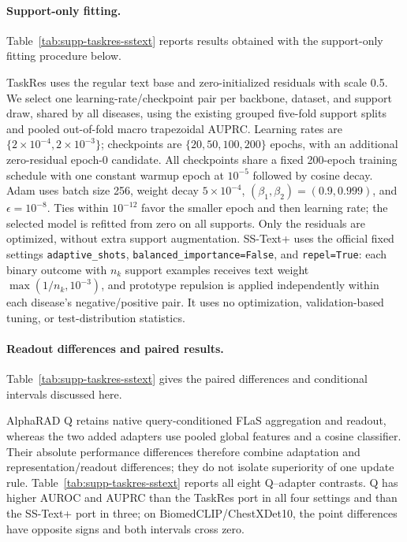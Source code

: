 \paragraph{Support-only fitting.}
Table~\ref{tab:supp-taskres-sstext} reports results obtained with the support-only fitting procedure below.

TaskRes uses the regular text base and zero-initialized residuals with scale 0.5. We select one learning-rate/checkpoint pair per backbone, dataset, and support draw, shared by all diseases, using the existing grouped five-fold support splits and pooled out-of-fold macro trapezoidal AUPRC. Learning rates are $\{2\!\times\!10^{-4},2\!\times\!10^{-3}\}$; checkpoints are $\{20,50,100,200\}$ epochs, with an additional zero-residual epoch-0 candidate. All checkpoints share a fixed 200-epoch training schedule with one constant warmup epoch at $10^{-5}$ followed by cosine decay. Adam uses batch size 256, weight decay $5\!\times\!10^{-4}$, $(\beta_1,\beta_2)=(0.9,0.999)$, and $\epsilon=10^{-8}$. Ties within $10^{-12}$ favor the smaller epoch and then learning rate; the selected model is refitted from zero on all supports. Only the residuals are optimized, without extra support augmentation. SS-Text+ uses the official fixed settings \texttt{adaptive\_shots}, \texttt{balanced\_importance=False}, and \texttt{repel=True}: each binary outcome with $n_k$ support examples receives text weight $\max(1/n_k,10^{-3})$, and prototype repulsion is applied independently within each disease's negative/positive pair. It uses no optimization, validation-based tuning, or test-distribution statistics.

\paragraph{Readout differences and paired results.}
Table~\ref{tab:supp-taskres-sstext} gives the paired differences and conditional intervals discussed here.

AlphaRAD Q retains native query-conditioned FLaS aggregation and readout, whereas the two added adapters use pooled global features and a cosine classifier. Their absolute performance differences therefore combine adaptation and representation/readout differences; they do not isolate superiority of one update rule. Table~\ref{tab:supp-taskres-sstext} reports all eight Q--adapter contrasts. Q has higher AUROC and AUPRC than the TaskRes port in all four settings and than the SS-Text+ port in three; on BiomedCLIP/ChestXDet10, the point differences have opposite signs and both intervals cross zero.

